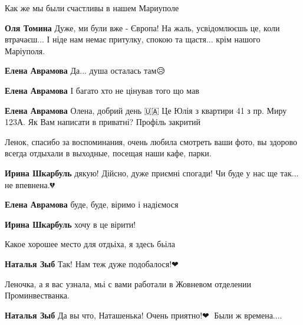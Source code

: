  
 
 
 
 

\qqSecCmt


Как же мы были счастливы в нашем Мариуполе🥹

\begin{itemize} %
\textbf{Оля Томина} Дуже, ми були вже - Європа! На жаль, усвідомлюєшь це, коли втрачаєш... І ніде нам немає притулку, спокою та щастя... крім нашого Маріуполя.

\begin{itemize} %
\textbf{Елена Аврамова} Да... душа осталась там😥

\textbf{Елена Аврамова} І багато хто не цінував того що мав

\textbf{Елена Аврамова} Олена, добрий день 🇺🇦 Це Юлія з квартири 41 з пр. Миру 123А. Як Вам написати в приватні? Профіль закритий
\end{itemize} %


Ленок, спасибо за воспоминания, очень любила смотреть ваши фото, вы здорово
всегда отдыхали в выходные, посещая наши кафе, парки.

\begin{itemize} %
\textbf{Ирина Шкарбуль} дякую! Дійсно, дуже приємні спогади! Чи буде у нас ще так...
не впевнена.💔

\textbf{Елена Аврамова} буде, буде, віримо і надіємося

\textbf{Ирина Шкарбуль} хочу в це вірити!
\end{itemize} %

\end{itemize} %


Какое хорошее место для отдьіха, я здесь бьіла

\begin{itemize} %
\textbf{Наталья Зыб} Так! Нам теж дуже подобалося!❤
\end{itemize} %


Леночка, а я вас узнала, мьі с вами работали в Жовневом отделении Проминвестванка.🥰

\textbf{Наталья Зыб} Да вы что, Наташенька! Очень приятно!❤💋 Были ж времена....
